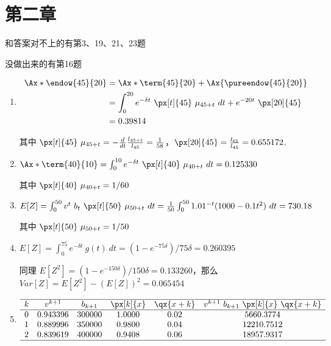 \documentclass[utf8]{ctexart}
\begin{document}
\section{第二章}

和答案对不上的有第3、19、21、23题

没做出来的有第16题

\begin{enumerate}
    \item \begin{align*}
    \Ax*{\endow{45}{20}} & = \Ax*{\term{45}{20}} + \Ax{\pureendow{45}{20}}\\
    & = \int_{0}^{20} e^{-\delta t}~\px[t]{45}~\mu_{45+t}~dt + e^{-20t}~\px[20]{45}\\
    & = 0.39814
    \end{align*}

    其中 $\px[t]{45}~\mu_{45+t} = -\frac{d}{dt}\frac{l_{45+t}}{l_{45}} = \frac{1}{58}$，$\px[20]{45} = \frac{l_{65}}{l_{45}} = 0.655172$.

    \item $\Ax*{\term{40}{10}} = \int_{0}^{10} e^{-\delta t}~\px[t]{40}~\mu_{40+t}~dt = 0.125330$

    其中 $\px[t]{40}~\mu_{40+t} = 1/60$

    \item $E[Z] = \int_{0}^{50} v^{t}~b_{t}~\px[t]{50}~\mu_{50+t}~dt = \frac{1}{50}\int_{0}^{50} 1.01^{-t}(1000-0.1t^{2})~dt = 730.18$

    其中 $\px[t]{50}~\mu_{50+t} = 1/50$

    \item $E[Z] = \int_{0}^{75} e^{-\delta t}~g(t)~dt = (1-e^{-75\delta})/75\delta = 0.260395$

    同理 $E[Z^{2}] = (1-e^{-150\delta})/150\delta = 0.133260$，那么 $Var[Z] = E[Z^{2}] - (E[Z])^{2} = 0.065454$

    \item $$\begin{array}{cccccc}
    \hline
    k & v^{k+1}     & b_{k+1} & \px[k]{x} & \qx{x+k} & v^{k+1}~b_{k+1}~\px[k]{x}~\qx{x+k}\\
    \hline
    0 & 0.943396 & 300000  & 1.0000    & 0.02     & 5660.3774\\
    1 & 0.889996 & 350000  & 0.9800    & 0.04     & 12210.7512\\
    2 & 0.839619 & 400000  & 0.9408    & 0.06     & 18957.9317\\
    \hline
    \end{array}$$


\end{enumerate}
\end{document}
